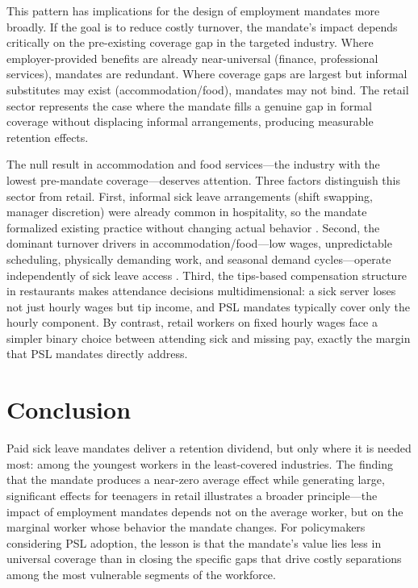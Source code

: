 \documentclass[12pt]{article}
\begin{document}
This pattern has implications for the design of employment mandates more broadly. If the goal is to reduce costly turnover, the mandate's impact depends critically on the pre-existing coverage gap in the targeted industry. Where employer-provided benefits are already near-universal (finance, professional services), mandates are redundant. Where coverage gaps are largest but informal substitutes may exist (accommodation/food), mandates may not bind. The retail sector represents the case where the mandate fills a genuine gap in formal coverage without displacing informal arrangements, producing measurable retention effects.

The null result in accommodation and food services---the industry with the lowest pre-mandate coverage---deserves attention. Three factors distinguish this sector from retail. First, informal sick leave arrangements (shift swapping, manager discretion) were already common in hospitality, so the mandate formalized existing practice without changing actual behavior \citep{heymann2009}. Second, the dominant turnover drivers in accommodation/food---low wages, unpredictable scheduling, physically demanding work, and seasonal demand cycles---operate independently of sick leave access \citep{lambert2012}. Third, the tips-based compensation structure in restaurants makes attendance decisions multidimensional: a sick server loses not just hourly wages but tip income, and PSL mandates typically cover only the hourly component. By contrast, retail workers on fixed hourly wages face a simpler binary choice between attending sick and missing pay, exactly the margin that PSL mandates directly address.

\section{Conclusion}

Paid sick leave mandates deliver a retention dividend, but only where it is needed most: among the youngest workers in the least-covered industries. The finding that the mandate produces a near-zero average effect while generating large, significant effects for teenagers in retail illustrates a broader principle---the impact of employment mandates depends not on the average worker, but on the marginal worker whose behavior the mandate changes. For policymakers considering PSL adoption, the lesson is that the mandate's value lies less in universal coverage than in closing the specific gaps that drive costly separations among the most vulnerable segments of the workforce.
\end{document}
